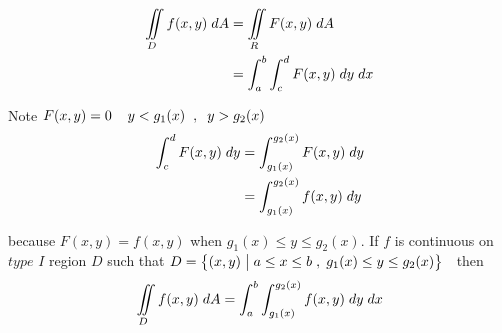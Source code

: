 \documentclass[11pt,a4paper]{article}
\theoremstyle{definition}
\begin{document}

\begin{figure}[H]
\centering
{}
\end{figure}

\begin{align*}
\iint\limits_D f(x,y)\hspace{0.1cm} dA & = \iint\limits_R F(x,y)\hspace{0.1cm}dA\\
& = \int^b_a\int^d_c F(x,y)\hspace{0.1cm} dy \hspace{0.1cm}dx\\
\end{align*} 

Note $F(x,y) = 0 \hspace{0.4cm} y<g_1(x) \hspace{0.2cm} , \hspace{0.2cm} y>g_2(x)$
\begin{align*}
\int^d_c F(x,y)\hspace{0.1cm}dy & = \int^{g_2(x)}_{g_1(x)} F(x,y)\hspace{0.1cm}dy\\
& = \int^{g_2(x)}_{g_1(x)} f(x,y)\hspace{0.1cm}dy\\
\end{align*} 

because $F(x,y) = f(x,y)$ when $g_1(x) \leq y \leq g_2(x)$. If $f$ is continuous on $\textit{type I}$ region $D$ such that \hspace{0.2cm}$D = \big\{ (x,y)\hspace{0.1cm} \big|\hspace{0.1cm} a\leq x \leq b \hspace{0.1cm} , \hspace{0.1cm} g_1(x)\leq y\leq g_2(x)\big\}\hspace{0.2cm}$ then $$\iint\limits_D f(x,y)\hspace{0.1cm}dA = \int^b_a\int^{g_2(x)}_{g_1(x)} f(x,y)\hspace{0.1cm}dy\hspace{0.1cm}dx$$
\end{document}
